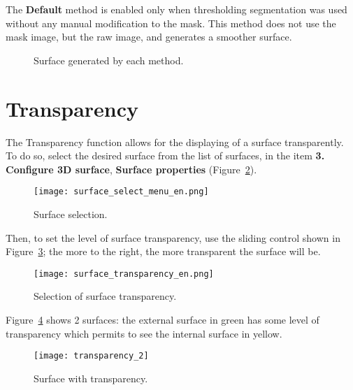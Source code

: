 The \textbf{Default} method is enabled only when thresholding segmentation was used without any manual modification to the mask. This method does not use the mask image, but the raw image, and generates a smoother surface.

\begin{figure}[!htb]
  \centering
  \hfill
  \hfill
  \caption{Surface generated by each method.}
  \label{fig:surf_method}
\end{figure}

\section{Transparency}

The Transparency function allows for the displaying of a surface transparently. To do so, select the desired surface from the list of surfaces, in the item \textbf{3. Configure 3D surface}, \textbf{Surface properties} (Figure~\ref{fig:select_surface}).

\begin{figure}[!htb]
\centering
\texttt{[image: surface\_select\_menu\_en.png]}
\caption{Surface selection.}
\label{fig:select_surface}
\end{figure}

Then, to set the level of surface transparency, use the sliding control shown in Figure~\ref{fig:select_transparency}; the more to the right, the more transparent the surface will be.

\begin{figure}[!htb]
\centering
\texttt{[image: surface\_transparency\_en.png]}
\caption{Selection of surface transparency.}
\label{fig:select_transparency}
\end{figure}

Figure~\ref{fig:model_transparency} shows 2 surfaces: the external surface in green has some level of transparency which permits to see the internal surface in yellow.

\begin{figure}[!htb]
\centering
\texttt{[image: transparency\_2]}
\caption{Surface with transparency.}
\label{fig:model_transparency}
\end{figure}

